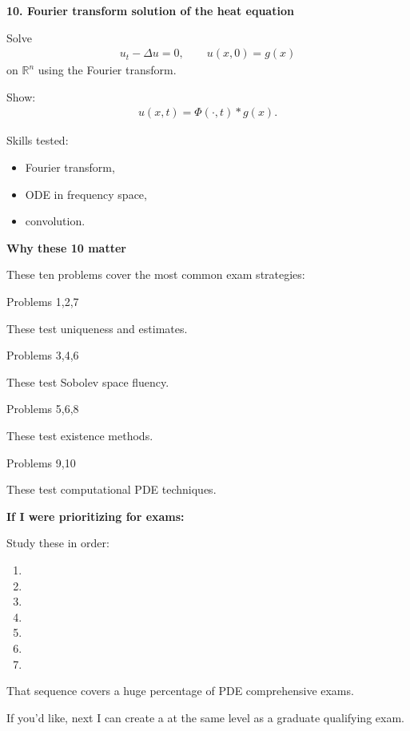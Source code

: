 \documentclass[12pt,a4paper]{report}
\begin{document}
\begin{description}
\newpage\item \textbf{10. Fourier transform solution of the heat equation}

Solve
\begin{align*}
u_t-\Delta u=0,\qquad u(x,0)=g(x)
\end{align*}
on $\mathbb R^n$ using the Fourier transform.

Show:
\begin{align*}
u(x,t)=\Phi(\cdot,t)\ast g(x).
\end{align*}

Skills tested:
	\begin{itemize}
    \item Fourier transform,
    \item ODE in frequency space,
    \item convolution.
	\end{itemize}

\newpage\item \textbf{ Why these 10 matter}

These ten problems cover the most common exam strategies:

	\begin{description}
    \item {}

Problems 1,2,7

These test uniqueness and estimates.

    \item {}

Problems 3,4,6

These test Sobolev space fluency.

    \item {}

Problems 5,6,8

These test existence methods.

    \item {}

Problems 9,10

These test computational PDE techniques.
	\end{description}

\item \textbf{If I were prioritizing for exams:}

Study these in order:
\begin{enumerate}
\item {}
\item {}
\item {}
\item {}
\item {}
\item {}
\item {}
\end{enumerate}

That sequence covers a huge percentage of PDE comprehensive exams.
\end{description}

If you'd like, next I can create a  at the same level as a graduate qualifying exam.
\end{document}
